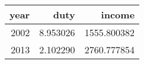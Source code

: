 \begin{tabular}{rrr}
\toprule
 year &      duty &       income \\
\midrule
 2002 &  8.953026 &  1555.800382 \\
 2013 &  2.102290 &  2760.777854 \\
\bottomrule
\end{tabular}
